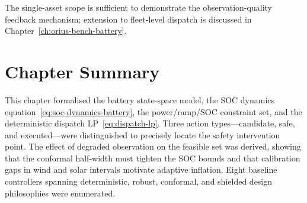 The single-asset scope is sufficient to demonstrate the observation-quality
feedback mechanism; extension to fleet-level dispatch is discussed in
Chapter~\ref{ch:orius-bench-battery}.

\section{Chapter Summary}

This chapter formalised the battery state-space model, the SOC dynamics
equation~\eqref{eq:soc-dynamics-battery}, the power/ramp/SOC constraint set, and the
deterministic dispatch LP~\eqref{eq:dispatch-lp}.  Three action types---candidate,
safe, and executed---were distinguished to precisely locate the safety
intervention point.  The effect of degraded observation on the feasible set
was derived, showing that the conformal half-width must tighten the SOC bounds
and that calibration gaps in wind and solar intervals motivate adaptive
inflation.  Eight baseline controllers spanning deterministic, robust,
conformal, and shielded design philosophies were enumerated.
